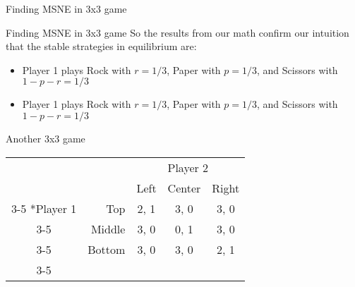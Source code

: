 
\begin{frame}{Finding MSNE in 3x3 game}
  \begin{minipage}{0.45\textwidth}
  \begin{center}
  \end{center}
  \end{minipage} 
  \begin{minipage}{0.45\textwidth}
  \begin{center}
  \end{center}
  \end{minipage} 
\end{frame}


\begin{frame}{Finding MSNE in 3x3 game}
  So the results from our math confirm our intuition that the stable strategies in equilibrium are:
  \begin{itemize}
    \item Player 1 plays Rock with $r=1/3$, Paper with $p=1/3$, and Scissors with
    $1-p-r=1/3$
    \item Player 1 plays Rock with $r=1/3$, Paper with $p=1/3$, and Scissors with
    $1-p-r=1/3$
  \end{itemize}
\end{frame}


\begin{frame}{Another 3x3 game}
 \begin{table}[h]
\centering
  \begin{tabular}{cr|c|c|c|}
	& \multicolumn{1}{c}{} & \multicolumn{3}{c}{Player 2}\\
    & \multicolumn{1}{c}{}            &  Left  & Center & Right  \\\cline{3-5}
    \multirow{3}*{Player 1}  & Top    &  2,  1 &  3,  0 &  3,  0 \\\cline{3-5}
                             & Middle &  3,  0 &  0,  1 &  3,  0 \\\cline{3-5}
                             & Bottom &  3,  0 &  3,  0 &  2,  1 \\\cline{3-5}
\end{tabular}
\end{table}
\end{frame}

